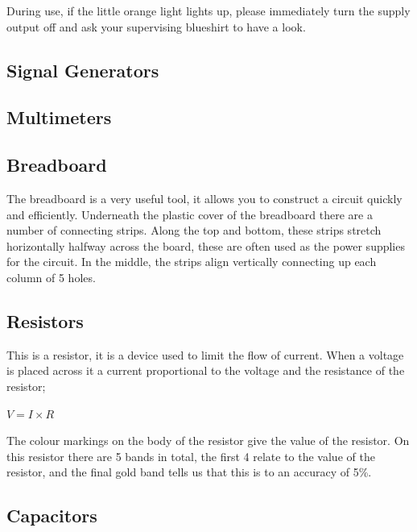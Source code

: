 During use, if the little orange light lights up, please immediately turn the supply output off and ask your supervising blueshirt to have a look.

\subsection{Signal Generators}

\subsection{Multimeters}

\subsection{Breadboard}
The breadboard is a very useful tool, it allows you to construct a circuit quickly and efficiently.
Underneath the plastic cover of the breadboard there are a number of connecting strips.
Along the top and bottom, these strips stretch horizontally halfway across the board, these are often used as the power supplies for the circuit.
In the middle, the strips align vertically connecting up each column of 5 holes.

\subsection{Resistors}
This is a resistor, it is a device used to limit the flow of current.
When a voltage is placed across it a current proportional to the voltage and the resistance of the resistor;

$V = I \times R$

The colour markings on the body of the resistor give the value of the resistor.
On this resistor there are 5 bands in total, the first 4 relate to the value of the resistor, and the final gold band tells us that this is to an accuracy of 5\%.

%

\subsection{Capacitors}



